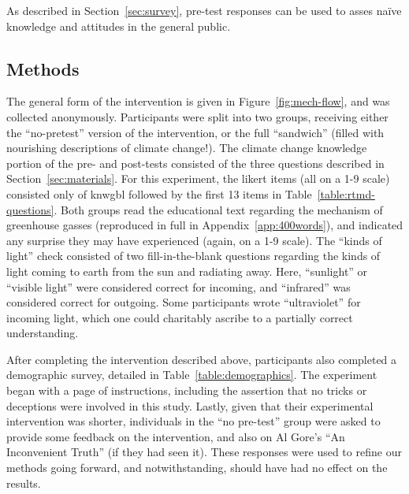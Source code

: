 As described in Section~\ref{sec:survey}, pre-test responses can be used to
asses na\"ive knowledge and attitudes in the general public. 


\subsection{Methods}

The general form of the intervention is given in Figure~\ref{fig:mech-flow}, and
was collected anonymously.  Participants were split into two groups, receiving
either the “no-pretest” version of the intervention, or the full “sandwich”
(filled with nourishing descriptions of climate change!). The climate change
knowledge portion of the pre- and post-tests consisted of the three questions
described in Section~\ref{sec:materials}. For this experiment, the likert items
(all on a 1-9 scale) consisted only of \textsf{knwgbl} followed by the first 13
items in Table~\ref{table:rtmd-questions}. Both groups read the educational text
regarding the mechanism of greenhouse gasses (reproduced in full in
Appendix~\ref{app:400words}), and indicated any surprise they may have
experienced (again, on a 1-9 scale). The “kinds of light” check consisted of two
fill-in-the-blank questions regarding the kinds of light coming to earth from
the sun and radiating away. Here, “sunlight” or “visible light” were considered
correct for incoming, and “infrared” was considered correct for outgoing.  Some
participants wrote “ultraviolet” for incoming light, which one could charitably
ascribe to a partially correct understanding.

After completing the intervention described above, participants also
completed a demographic survey, detailed in Table~\ref{table:demographics}.
The experiment began with a page of instructions, including the assertion that
no tricks or deceptions were involved in this study. Lastly, given that their
experimental intervention was shorter, individuals in the “no pre-test” group
were asked to provide some feedback on the intervention, and also on Al Gore’s
“An Inconvenient Truth” (if they had seen it). These responses were used to
refine our methods going forward, and \textcite{bem-future} notwithstanding,
should have had no effect on the results.

